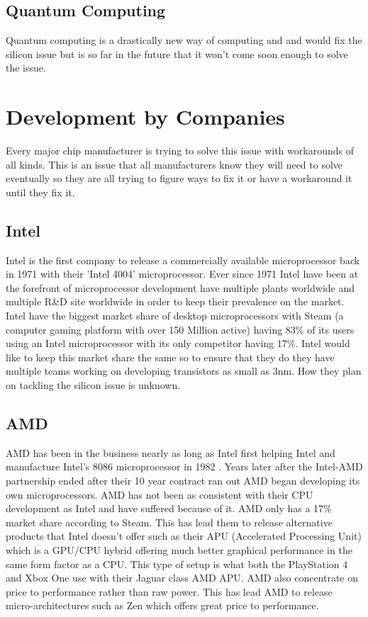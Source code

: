 \documentclass[journal]{IEEEtran}
\begin{document}
\subsection{Quantum Computing}
Quantum computing is a drastically new way of computing and and would fix the silicon issue but is so far in the future that it won't come soon enough to solve the issue.

\section{Development by Companies}
Every major chip manufacturer is trying to solve this issue with workarounds of all kinds. This is an issue that all manufacturers know they will need to solve eventually so they are all trying to figure ways to fix it or have a workaround it until they fix it.

\subsection{Intel}
Intel is the first company to release a commercially available microprocessor back in 1971 with their 'Intel 4004' microprocessor. Ever since 1971 Intel have been at the forefront of microprocessor development have multiple plants worldwide and multiple R\&D site worldwide in order to keep their prevalence on the market. Intel have the biggest market share of desktop microprocessors with Steam (a computer gaming platform with over 150 Million active) having 83\% \cite{8732145520170101} of its users using an Intel microprocessor with its only competitor having 17\%. Intel would like to keep this market share the same so to ensure that they do they have multiple teams working on developing transistors as small as 3nm. How they plan on tackling the silicon issue is unknown.

\subsection{AMD}
AMD has been in the business nearly as long as Intel first helping Intel and manufacture Intel's 8086 microprocessor in 1982 \cite{8914118120180101}. Years later after the Intel-AMD partnership ended after their 10 year contract ran out AMD began developing its own microprocessors. AMD has not been as consistent with their CPU development as Intel and have suffered because of it. AMD only has a 17\% market share according to Steam. This has lead them to release alternative products that Intel doesn't offer such as their APU (Accelerated Processing Unit) which is a GPU/CPU hybrid offering much better graphical performance in the same form factor as a CPU. This type of setup is what both the PlayStation 4 and Xbox One use with their Jaguar class AMD APU. AMD also concentrate on price to performance rather than raw power. This has lead AMD to release micro-architectures such as Zen which offers great price to performance.
\end{document}
